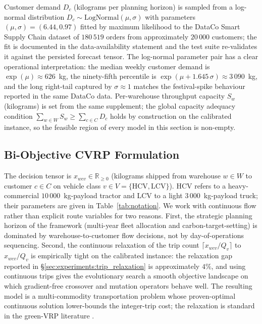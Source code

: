 \documentclass[review,preprint,authoryear,12pt]{elsarticle}
\begin{document}
Customer demand $D_c$ (kilograms per planning horizon) is sampled
from a log-normal distribution $D_c \sim \mathrm{LogNormal}(\mu,
\sigma)$ with parameters $(\mu, \sigma) = (6.44, 0.97)$ fitted by
maximum likelihood to the DataCo Smart Supply Chain dataset of
$180\,519$ orders from approximately $20\,000$ customers; the fit is
documented in the data-availability statement and the test suite
re-validates it against the persisted forecast tensor. The log-normal
parameter pair has a clear operational interpretation: the median
weekly customer demand is $\exp(\mu) \approx 626$~kg, the
ninety-fifth percentile is
$\exp(\mu + 1.645\,\sigma) \approx 3\,090$~kg, and the long
right-tail captured by $\sigma \approx 1$ matches the festival-spike
behaviour reported in the same DataCo data. Per-warehouse throughput
capacity $S_w$ (kilograms) is set from the same supplement; the
global capacity adequacy condition
$\sum_{w \in W} S_w \geq \sum_{c \in C} D_c$ holds by construction
on the calibrated instance, so the feasible region of every model in
this section is non-empty.

\subsection{Bi-Objective CVRP Formulation}
\label{sec:formulation:biobj}

The decision tensor is $x_{wcv} \in \mathbb{R}_{\geq 0}$ (kilograms
shipped from warehouse $w \in W$ to customer $c \in C$ on vehicle
class $v \in V = \{\mathrm{HCV}, \mathrm{LCV}\}$). HCV refers to a
heavy-commercial $10\,000$~kg-payload tractor and LCV to a light
$3\,000$~kg-payload truck; their parameters are given in
Table~\ref{tab:notation}. We work with continuous flow rather than
explicit route variables for two reasons. First, the strategic
planning horizon of the framework (multi-year fleet allocation and
carbon-target-setting) is dominated by warehouse-to-customer flow
decisions, not by day-of-operations sequencing. Second, the
continuous relaxation of the trip count
$\lceil x_{wcv}/Q_v \rceil$ to $x_{wcv}/Q_v$ is empirically tight on
the calibrated instance: the relaxation gap reported in
\S\ref{sec:experiments:trip_relaxation} is approximately $4\%$, and
using continuous trips gives the evolutionary search a smooth
objective landscape on which gradient-free crossover and mutation
operators behave well. The resulting model is a multi-commodity
transportation problem whose proven-optimal continuous solution
lower-bounds the integer-trip cost; the relaxation is standard in the
green-VRP literature \citep{demir2014bi_objective_prp}.
\end{document}
